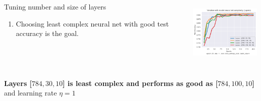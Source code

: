\documentclass[12pt,t]{beamer}
\begin{document}
\begin{frame}[t]
\begin{columns}
\begin{column}[T]{0.4\linewidth}
\begin{block}{Tuning number and size of layers}
\begin{enumerate}
                    \item Choosing least complex neural net with good test accuracy is the goal.
                \end{enumerate}
            \end{block}
        \end{column}
        \begin{column}[T]{0.6\linewidth}
            \vspace{10pt}
            \includegraphics[width=\linewidth,height=90pt]{sigmoid/hiddenLayer_variation.png}
        \end{column}
    \end{columns}
    
    \centering
    \textbf{Layers [$784,30,10$] is least complex and performs as good as [$784,100,10$]} and learning rate $\eta = 1$

\end{frame}
\end{document}
